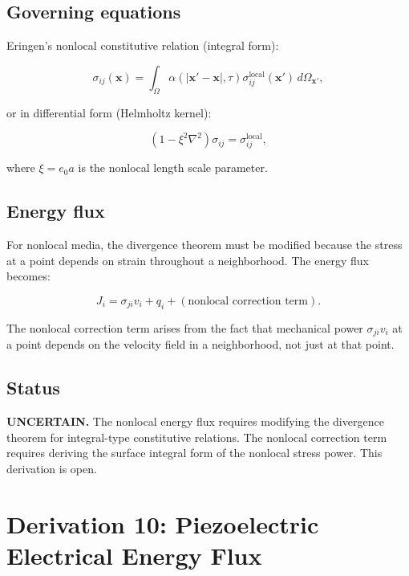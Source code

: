 \subsection{Governing equations}

Eringen's nonlocal constitutive relation (integral form):

\begin{equation}
\sigma_{ij}(\bm{x}) = \int_\Omega \alpha(|\bm{x}' - \bm{x}|, \tau) \sigma_{ij}^{\text{local}}(\bm{x}') \, d\Omega_{\bm{x}'},
\label{ef:nonlocal:1}
\end{equation}

or in differential form (Helmholtz kernel):

\begin{equation}
(1 - \xi^2\nabla^2)\sigma_{ij} = \sigma_{ij}^{\text{local}},
\label{ef:nonlocal:2}
\end{equation}

where $\xi = e_0 a$ is the nonlocal length scale parameter.

\subsection{Energy flux}

For nonlocal media, the divergence theorem must be modified because the stress at a point depends on strain throughout a neighborhood. The energy flux becomes:

\begin{equation}
J_i = \sigma_{ji}v_i + q_i + (\text{nonlocal correction term}).
\label{ef:nonlocal:3}
\end{equation}

The nonlocal correction term arises from the fact that mechanical power $\sigma_{ji}v_i$ at a point depends on the velocity field in a neighborhood, not just at that point.

\subsection{Status}

\textbf{UNCERTAIN.} The nonlocal energy flux requires modifying the divergence theorem for integral-type constitutive relations. The nonlocal correction term requires deriving the surface integral form of the nonlocal stress power. This derivation is open.

\section{Derivation 10: Piezoelectric Electrical Energy Flux}

